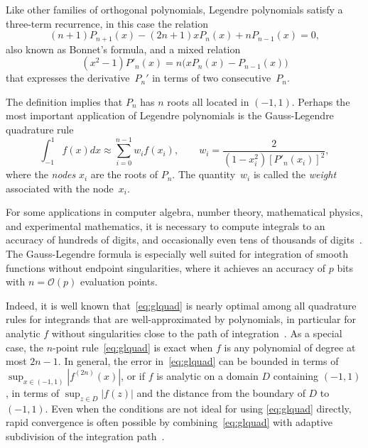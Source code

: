 \documentclass{siamart0216}
\newcommand{\OO}{\mathcal{O}}
\begin{document}
Like other families of orthogonal polynomials, Legendre polynomials
satisfy a three-term recurrence, in this case the relation
\begin{equation} \label{eq:recurrence}
  (n + 1) P_{n+1}(x) - (2n + 1) x P_n(x) + n P_{n-1}(x) = 0,
\end{equation}
also known as Bonnet's formula, and a mixed relation
\begin{equation} \label{eq:mixed}
  (x^2 - 1) P'_n(x) = n \bigl( x P_n(x) - P_{n-1}(x) \bigl)
\end{equation}
that expresses the derivative $P_n'$ in terms of two
consecutive $P_n$.

The definition implies that $P_n$ has $n$ roots all located in $(-1,1)$.
Perhaps the most important application of Legendre polynomials
is the Gauss-Legendre quadrature rule
\begin{equation}
\int_{-1}^{1} f(x) dx \approx \sum_{i=0}^{n-1} w_i f(x_i), \qquad
w_i = \frac{2}{(1-x_i^2) [P'_n(x_i)]^2},
\label{eq:glquad}
\end{equation}
where the \emph{nodes} $x_i$ are the roots of $P_n$.
The quantity~$w_i$ is called the \emph{weight} associated
with the node~$x_i$.

For some applications in computer algebra, number theory,
mathematical physics, and experimental mathematics,
it is necessary to compute integrals to an accuracy of
hundreds of digits, and occasionally even tens of
thousands of digits~\cite{bailey2011high}.
The Gauss-Legendre formula is especially well suited for
integration of smooth functions without endpoint singularities, where it
achieves an accuracy of $p$ bits with $n = \OO(p)$ evaluation points.

Indeed, it is well known that~\eqref{eq:glquad} is nearly optimal among
all quadrature rules for integrands that are
well-approximated by polynomials, in particular for
analytic $f$ without singularities close to
the path of integration~\cite{kowalski1985gauss,trefethen2008gauss}.
As a special case, the $n$-point rule~\eqref{eq:glquad} is exact
when $f$ is any polynomial of degree at most $2n-1$.
In general, the error in~\eqref{eq:glquad} can be bounded in terms of
$\sup_{x \in (-1,1)} |f^{(2n)}(x)|$, or if $f$ is analytic on a domain $D$
containing $(-1,1)$, in terms of $\sup_{z \in D} |f(z)|$
and the distance from the boundary of $D$ to $(-1,1)$.
Even when the conditions are not ideal for using \eqref{eq:glquad} directly,
rapid convergence is often possible
by combining~\eqref{eq:glquad}
with adaptive subdivision of the integration path~\cite{petras2002self}.
\end{document}
